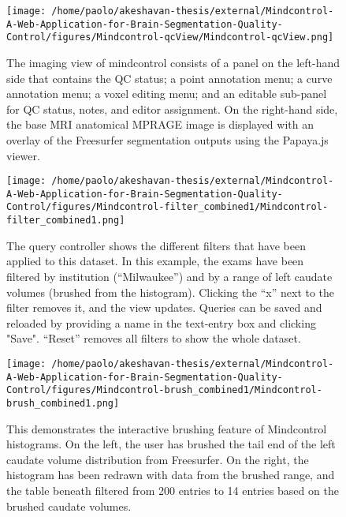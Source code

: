 \begin{figure}[]
\begin{center}
\texttt{[image: /home/paolo/akeshavan-thesis/external/Mindcontrol-A-Web-Application-for-Brain-Segmentation-Quality-Control/figures/Mindcontrol-qcView/Mindcontrol-qcView.png]}
\caption{ \protect\label{fig:imagingview}
The imaging view of mindcontrol consists of a panel on the left-hand side that contains the QC status; a point annotation menu; a curve annotation menu; a voxel editing menu; and an editable sub-panel for QC status, notes, and editor assignment. On the right-hand side, the base MRI anatomical MPRAGE image is displayed with an overlay of the Freesurfer segmentation outputs using the Papaya.js viewer.}
\end{center}
\end{figure}


\begin{figure}[]
\begin{center}
\texttt{[image: /home/paolo/akeshavan-thesis/external/Mindcontrol-A-Web-Application-for-Brain-Segmentation-Quality-Control/figures/Mindcontrol-filter\_combined1/Mindcontrol-filter\_combined1.png]}
\caption{ \protect\label{fig:query}
The query controller shows the different filters that have been applied to this dataset. In this example, the exams have been filtered by institution (``Milwaukee'') and by a range of left caudate volumes (brushed from the histogram). Clicking the ``x'' next to the filter removes it, and the view updates. Queries can be saved and reloaded by providing a name in the text-entry box and clicking "Save". ``Reset'' removes all filters to show the whole dataset.}
\end{center}
\end{figure}


\begin{figure}[]
\begin{center}
\texttt{[image: /home/paolo/akeshavan-thesis/external/Mindcontrol-A-Web-Application-for-Brain-Segmentation-Quality-Control/figures/Mindcontrol-brush\_combined1/Mindcontrol-brush\_combined1.png]}
\caption{ \protect\label{fig:brush}
This demonstrates the interactive brushing feature of Mindcontrol histograms. On the left, the user has brushed the tail end of the left caudate volume distribution from Freesurfer. On the right, the histogram has been redrawn with data from the brushed range, and the table beneath filtered from 200 entries to 14 entries based on the brushed caudate volumes.}
\end{center}
\end{figure}

